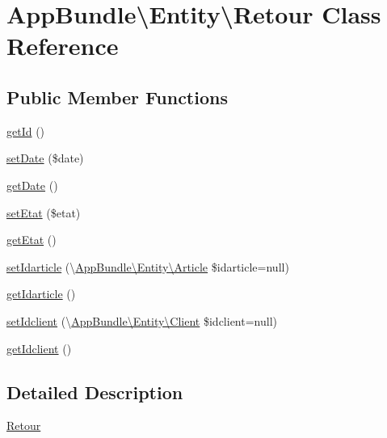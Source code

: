 \hypertarget{class_app_bundle_1_1_entity_1_1_retour}{}\section{App\+Bundle\textbackslash{}Entity\textbackslash{}Retour Class Reference}
\label{class_app_bundle_1_1_entity_1_1_retour}
\subsection*{Public Member Functions}
\begin{DoxyCompactItemize}
\item 
\hyperlink{class_app_bundle_1_1_entity_1_1_retour_a1f99a8dc7d6e62da5d8fe53b1988c41d}{get\+Id} ()
\item 
\hyperlink{class_app_bundle_1_1_entity_1_1_retour_ad4fb980be4203f98f933da8017841934}{set\+Date} (\$date)
\item 
\hyperlink{class_app_bundle_1_1_entity_1_1_retour_aae73266b4ca044dc5ad64731e52c0b08}{get\+Date} ()
\item 
\hyperlink{class_app_bundle_1_1_entity_1_1_retour_a7d8400e9e97fee12f12b22d24d540a0f}{set\+Etat} (\$etat)
\item 
\hyperlink{class_app_bundle_1_1_entity_1_1_retour_a981b812ddc862f672b037a33057d9eb7}{get\+Etat} ()
\item 
\hyperlink{class_app_bundle_1_1_entity_1_1_retour_a53f5f191798d07e2f319183dfec0b29c}{set\+Idarticle} (\textbackslash{}\hyperlink{class_app_bundle_1_1_entity_1_1_article}{App\+Bundle\textbackslash{}\+Entity\textbackslash{}\+Article} \$idarticle=null)
\item 
\hyperlink{class_app_bundle_1_1_entity_1_1_retour_a188d35bf9fef6b6032ce58dadc5f0cae}{get\+Idarticle} ()
\item 
\hyperlink{class_app_bundle_1_1_entity_1_1_retour_a7df4640bd39bd942f7cd99a57b77ba8a}{set\+Idclient} (\textbackslash{}\hyperlink{class_app_bundle_1_1_entity_1_1_client}{App\+Bundle\textbackslash{}\+Entity\textbackslash{}\+Client} \$idclient=null)
\item 
\hyperlink{class_app_bundle_1_1_entity_1_1_retour_a3ecb8b4e4903a7e314b4d8f701ce8954}{get\+Idclient} ()
\end{DoxyCompactItemize}


\subsection{Detailed Description}
\hyperlink{class_app_bundle_1_1_entity_1_1_retour}{Retour}

